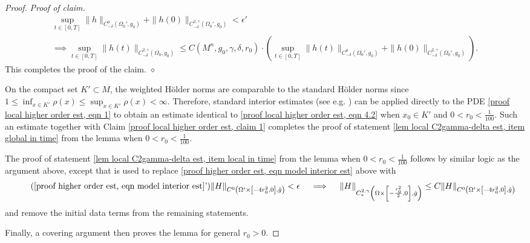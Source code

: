 \documentclass[12pt]{amsart}
\renewcommand{\1}{{\mathbf 1}}
\newenvironment{claimproof}{\par\noindent\textit{Proof of claim.}\space}{\hfill$\diamond$\medskip\par}
\theoremstyle{others}
\numberwithin{equation}{section}
\begin{document}
\begin{proof}
\begin{claimproof}
        \begin{multline} \label{proof local higher order est, eqn 4.2}
            \sup_{t \in [0, T]} \| h \|_{C^{0}_{-\delta} (\Omega_0' , g_0) } + \| h ( 0)\|_{C^{2, \gamma}_{-\delta}(\Omega_0', g_0)} <  \epsilon' \\
            \implies 
            \sup_{t \in [0, T]} \| h(t) \|_{C^{2, \gamma}_{-\delta} ( \Omega_0 , g_0) } 
            \le C(M^n, g_0, \gamma,\delta, r_0) \cdot \left( \sup_{t \in [0, T]} \| h(t) \|_{C^{0}_{-\delta} (\Omega_0', g_0)} + \| h(0) \|_{C^{2, \gamma}_{-\delta} (\Omega_0', g_0)} \right) .
        \end{multline}
        This completes the proof of the claim.
    \end{claimproof}

    On the compact set $K' \subset M$, the weighted H{\"o}lder norms are comparable to the standard H{\"o}lder norms since $1 \le \inf_{x \in K'} \rho(x) \le \sup_{x \in K'} \rho(x) < \infty$.
    Therefore, standard interior estimates (see e.g. \cite[Propositions C.3, C.4]{Stolarski25}) can be applied directly to the PDE \eqref{proof local higher order est, eqn 1} to obtain an estimate identical to \eqref{proof local higher order est, eqn 4.2} when $x_0 \in K'$ and $0 < r_0 < \frac1{100}$.
    Such an estimate together with Claim \ref{proof local higher order est, claim 1} completes the proof of statement \eqref{lem local C2gamma-delta est, item global in time} from the lemma when $0 < r_0 < \frac1{100}$. 

    The proof of statement \eqref{lem local C2gamma-delta est, item local in time} from the lemma when $0 < r_0 < \frac1{100}$ follows by similar logic as the argument above, except that \cite[Proposition C.3]{Stolarski25} is used to replace \eqref{proof higher order est, eqn model interior est} above with
    \begin{equation} \tag{\ref{proof higher order est, eqn model interior est}'}
        \| H \|_{C^0 \left( \Omega' \times \left[ -4 r_0^2, 0\right] ,  \hat g \right)}  < \epsilon \quad 
        \implies 
        \quad \| H \|_{C^{2, \gamma}_* \left( \Omega \times \left[ -\frac{r_0^2}{2}, 0\right] ,  \hat g \right) }
        \le C  \| H \|_{C^0 \left( \Omega' \times \left[ - 4 r_0^2, 0\right] ,  \hat g \right) } 
    \end{equation}
    and remove the initial data terms from the remaining statements.

    Finally, a covering argument then proves the lemma for general $r_0 > 0$.
\end{proof}
\end{document}
